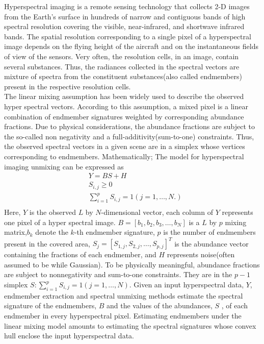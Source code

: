 \documentclass[14pt]{book}
\begin{document}
\fontsize{10.95}{14pt plus.8pt minus .6pt}\selectfont
\setcounter{chapter}{1}
\setcounter{equation}{0} %
Hyperspectral imaging is a remote sensing technology that collects 2-D images from the Earth's surface in hundreds of narrow and contiguous bands of high spectral resolution covering the visible, near-infrared, and shortwave infrared bands. The spatial resolution corresponding to a single pixel of a hyperspectral image depends on the flying height of the aircraft and on the instantaneous fields of view of the sensors. Very often, the resolution cells, in an image, contain several substances. Thus, the radiances collected in the spectral vectors are mixture of spectra from the constituent substances(also called endmembers) present in the respective resolution cells. \\
The linear mixing assumption has been widely used to describe the observed hyper spectral vectors. According to this assumption, a mixed pixel is a linear combination of endmember signatures weighted by corresponding abundance fractions. Due to physical considerations, the abundance fractions are subject to the so-called non negativity and a full-additivity(sum-to-one) constraints. Thus, the observed spectral vectors in a given scene are in a simplex whose vertices corresponding to endmembers. Mathematically; The model for hyperspectral imaging unmixing can be expressed as 
\begin{equation}
\begin{aligned}
& Y = BS+H\\
& S_{i,j}\geq 0\\
& \sum_{i=1}^p S_{i,j} =1 (j=1, \ldots, N.)\\
\end{aligned}
\end{equation}
Here, $Y$ is the observed $L$ by $N$-dimensional vector, each column of $Y$ represents one pixel of a hyper spectral image. $B=[b_{1},b_{2},b_{3}, \dots, b_{N}]$ is a $L$ by $p$ mixing matrix,$b_{k}$ denote the $k$-th endmember signature, $p$ is the number of endmembers present in the covered area,  $S_{j} = [S_{1,j},S_{2,j}, \dots, S_{p,j}]^T$ is the abundance vector containing the fractions of each endmember, and  $H$ represents noise(often assumed to be while Gaussian).  To be physically meaningful, abundance fractions are subject to nonnegativity and sum-to-one constraints. They are in the $p-1$ simplex  ${S: \sum_{i=1}^p S_{i,j} =1 (j=1, \ldots, N) }$. Given an input hyperspectral data, $Y$, endmember extraction and spectral unmixing methods estimate the spectral signature of the endmembers, $B$ and the values of the abundances, $S$ , of each endmember in every hyperspectral pixel. Estimating endmembers under the linear mixing model amounts to estimating the spectral signatures whose convex hull enclose the input hyperspectral data. 
\end{document}
